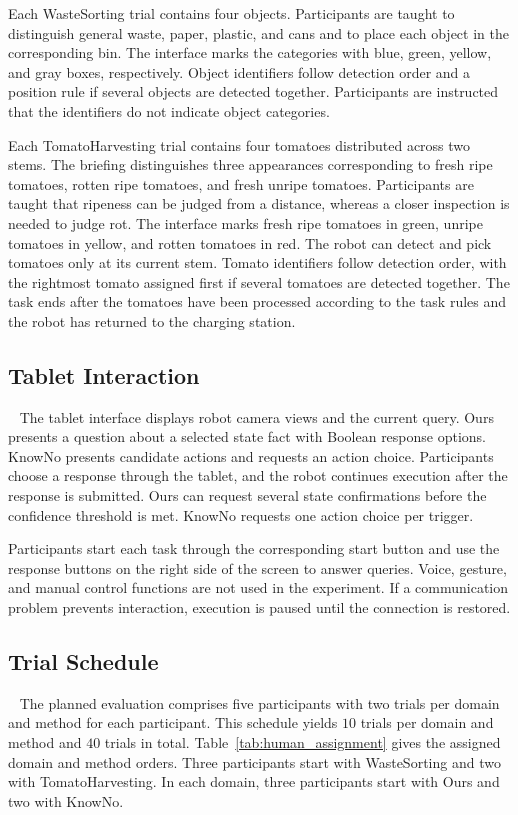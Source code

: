 Each WasteSorting trial contains four objects. Participants are taught to distinguish general waste, paper, plastic, and cans and to place each object in the corresponding bin. The interface marks the categories with blue, green, yellow, and gray boxes, respectively. Object identifiers follow detection order and a position rule if several objects are detected together. Participants are instructed that the identifiers do not indicate object categories.

Each TomatoHarvesting trial contains four tomatoes distributed across two stems. The briefing distinguishes three appearances corresponding to fresh ripe tomatoes, rotten ripe tomatoes, and fresh unripe tomatoes. Participants are taught that ripeness can be judged from a distance, whereas a closer inspection is needed to judge rot. The interface marks fresh ripe tomatoes in green, unripe tomatoes in yellow, and rotten tomatoes in red. The robot can detect and pick tomatoes only at its current stem. Tomato identifiers follow detection order, with the rightmost tomato assigned first if several tomatoes are detected together. The task ends after the tomatoes have been processed according to the task rules and the robot has returned to the charging station.

\subsection{Tablet Interaction}~\label{appx:user_assignment}
The tablet interface displays robot camera views and the current query. Ours presents a question about a selected state fact with Boolean response options. KnowNo presents candidate actions and requests an action choice. Participants choose a response through the tablet, and the robot continues execution after the response is submitted. Ours can request several state confirmations before the confidence threshold is met. KnowNo requests one action choice per trigger.

Participants start each task through the corresponding start button and use the response buttons on the right side of the screen to answer queries. Voice, gesture, and manual control functions are not used in the experiment. If a communication problem prevents interaction, execution is paused until the connection is restored.

\subsection{Trial Schedule}~\label{appx:user_schedule}
The planned evaluation comprises five participants with two trials per domain and method for each participant. This schedule yields $10$ trials per domain and method and $40$ trials in total. Table~\ref{tab:human_assignment} gives the assigned domain and method orders. Three participants start with WasteSorting and two with TomatoHarvesting. In each domain, three participants start with Ours and two with KnowNo.

